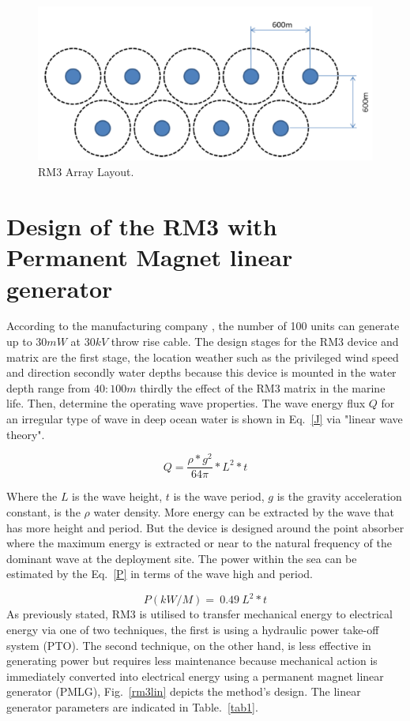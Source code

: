 \documentclass[conference]{IEEEtran}
\begin{document}
\begin{figure}[htbp]
	\centerline{\includegraphics[width=2 in]{fig/3.png}}
	\caption{RM3 Array Layout\cite{neary2014methodology}.}
	\label{rm3arr}
\end{figure}
\section{Design of the RM3 with Permanent Magnet linear generator}
According to the manufacturing company \cite{neary2014methodology}, the number of 100 units can generate up to $30 mW$ at $30 kV$ throw rise cable. The design stages for the RM3 device and matrix are the first stage, the location weather such as the privileged wind speed and direction secondly water depths because this device is mounted in the water depth range from $40:100 m$ thirdly the effect of the RM3 matrix in the marine life. Then, determine the operating wave properties. The wave energy flux $Q$ for an irregular type of wave in deep ocean water is shown in Eq.~\ref{J} via "linear wave theory"\cite{reviewofwaveenergy}.

\begin{equation}
Q=\dfrac{\rho * g^2}{64\pi} * L^2 * t\label{J}
\end{equation}


Where the $L$ is the wave height, $t$ is the wave period, $g$ is the gravity acceleration constant, is the $\rho$ water density. More energy can be extracted by the wave that has more height and period. But the device is designed around the point absorber where the maximum energy is extracted or near to the natural frequency of the dominant wave at the deployment site. The power within the sea can be estimated by the Eq.~\ref{P} in terms of the wave high and period.


\begin{equation}
	P(kW/M)=\ 0.49\ L^2 * t\label{P}
\end{equation}
As previously stated, RM3 is utilised to transfer mechanical energy to electrical energy via one of two techniques, the first is using a hydraulic power take-off system (PTO). The second technique, on the other hand, is less effective in generating power but requires less maintenance because mechanical action is immediately converted into electrical energy using a permanent magnet linear generator (PMLG), Fig.~\ref{rm3lin} depicts the method's design. The linear generator parameters are indicated in Table.~\ref{tab1}.
\end{document}
